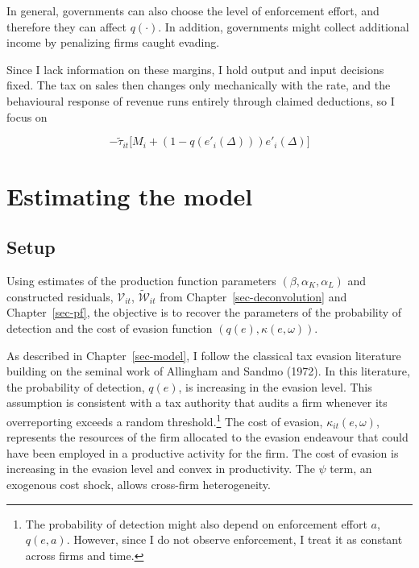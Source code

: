 \documentclass[
  12pt,
  letterpaper,
  oneside,
  openany]{report}
\begin{document}
In general, governments can also choose the level of enforcement effort,
and therefore they can affect \(q(\cdot)\). In addition, governments
might collect additional income by penalizing firms caught evading.

Since I lack information on these margins, I hold output and input
decisions fixed. The tax on sales then changes only mechanically with
the rate, and the behavioural response of revenue runs entirely through
claimed deductions, so I focus on

\[
-\tilde\tau_{it}\big[M_i+(1-q(e'_i(\Delta)))e'_i(\Delta)\big]
\]

\section{Estimating the model}\label{estimating-the-model}

\subsection{Setup}\label{setup-1}

Using estimates of the production function parameters
\((\beta,\alpha_K, \alpha_L)\) and constructed residuals,
\(\mathcal V_{it}\), \(\tilde{\mathcal W}_{it}\) from
Chapter~\ref{sec-deconvolution} and Chapter~\ref{sec-pf}, the objective
is to recover the parameters of the probability of detection and the
cost of evasion function \((q(e),\kappa(e,\omega))\).

As described in Chapter~\ref{sec-model}, I follow the classical tax
evasion literature building on the seminal work of Allingham and Sandmo
(1972). In this literature, the probability of detection, \(q(e)\), is
increasing in the evasion level. This assumption is consistent with a
tax authority that audits a firm whenever its overreporting exceeds a
random threshold.\footnote{The probability of detection might also
  depend on enforcement effort \(a\), \(q(e,a)\). However, since I do
  not observe enforcement, I treat it as constant across firms and time.}
The cost of evasion, \(\kappa_{it}(e,\omega)\), represents the resources
of the firm allocated to the evasion endeavour that could have been
employed in a productive activity for the firm. The cost of evasion is
increasing in the evasion level and convex in productivity. The \(\psi\)
term, an exogenous cost shock, allows cross-firm heterogeneity.
\end{document}
